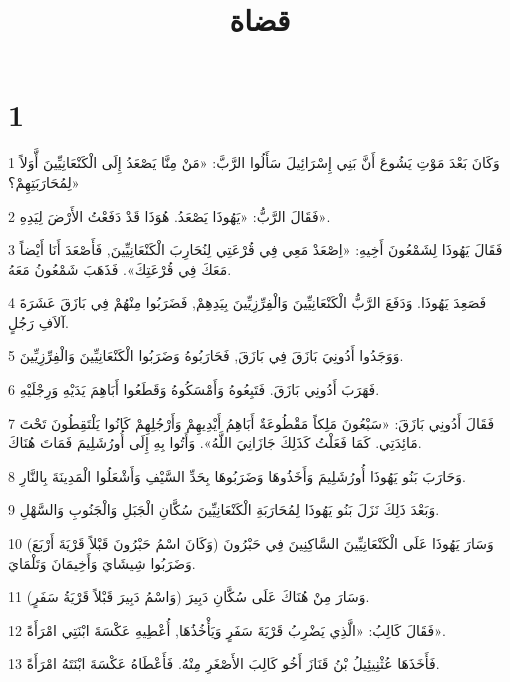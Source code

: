 

\title{قضاة }


\chapter{1}

\par 1 وَكَانَ بَعْدَ مَوْتِ يَشُوعَ أَنَّ بَنِي إِسْرَائِيلَ سَأَلُوا الرَّبَّ: «مَنْ مِنَّا يَصْعَدُ إِلَى الْكَنْعَانِيِّينَ أَّوَلاً لِمُحَارَبَتِهِمْ؟»
\par 2 فَقَالَ الرَّبُّ: «يَهُوذَا يَصْعَدُ. هُوَذَا قَدْ دَفَعْتُ الأَرْضَ لِيَدِهِ».
\par 3 فَقَالَ يَهُوذَا لِشَمْعُونَ أَخِيهِ: «اِصْعَدْ مَعِي فِي قُرْعَتِي لِنُحَارِبَ الْكَنْعَانِيِّينَ, فَأَصْعَدَ أَنَا أَيْضاً مَعَكَ فِي قُرْعَتِكَ». فَذَهَبَ شَمْعُونُ مَعَهُ.
\par 4 فَصَعِدَ يَهُوذَا. وَدَفَعَ الرَّبُّ الْكَنْعَانِيِّينَ وَالْفِرِّزِيِّينَ بِيَدِهِمْ, فَضَرَبُوا مِنْهُمْ فِي بَازَقَ عَشَرَةَ آلاَفِ رَجُلٍ.
\par 5 وَوَجَدُوا أَدُونِيَ بَازَقَ فِي بَازَقَ, فَحَارَبُوهُ وَضَرَبُوا الْكَنْعَانِيِّينَ وَالْفِرِّزِيِّينَ.
\par 6 فَهَرَبَ أَدُونِي بَازَقَ. فَتَبِعُوهُ وَأَمْسَكُوهُ وَقَطَعُوا أَبَاهِمَ يَدَيْهِ وَرِجْلَيْهِ.
\par 7 فَقَالَ أَدُونِي بَازَقَ: «سَبْعُونَ مَلِكاً مَقْطُوعَةٌ أَبَاهِمُ أَيْدِيهِمْ وَأَرْجُلِهِمْ كَانُوا يَلْتَقِطُونَ تَحْتَ مَائِدَتِي. كَمَا فَعَلْتُ كَذَلِكَ جَازَانِيَ اللَّهُ». وَأَتُوا بِهِ إِلَى أُورُشَلِيمَ فَمَاتَ هُنَاكَ.
\par 8 وَحَارَبَ بَنُو يَهُوذَا أُورُشَلِيمَ وَأَخَذُوهَا وَضَرَبُوهَا بِحَدِّ السَّيْفِ وَأَشْعَلُوا الْمَدِينَةَ بِالنَّارِ.
\par 9 وَبَعْدَ ذَلِكَ نَزَلَ بَنُو يَهُوذَا لِمُحَارَبَةِ الْكَنْعَانِيِّينَ سُكَّانِ الْجَبَلِ وَالْجَنُوبِ وَالسَّهْلِ.
\par 10 وَسَارَ يَهُوذَا عَلَى الْكَنْعَانِيِّينَ السَّاكِنِينَ فِي حَبْرُونَ (وَكَانَ اسْمُ حَبْرُونَ قَبْلاً قَرْيَةَ أَرْبَعَ) وَضَرَبُوا شِيشَايَ وَأَخِيمَانَ وَتَلْمَايَ.
\par 11 وَسَارَ مِنْ هُنَاكَ عَلَى سُكَّانِ دَبِيرَ (وَاسْمُ دَبِيرَ قَبْلاً قَرْيَةُ سَفَرٍ).
\par 12 فَقَالَ كَالِبُ: «الَّذِي يَضْرِبُ قَرْيَةَ سَفَرٍ وَيَأْخُذُهَا, أُعْطِيهِ عَكْسَةَ ابْنَتِي امْرَأَةً».
\par 13 فَأَخَذَهَا عُثْنِيئِيلُ بْنُ قَنَازَ أَخُو كَالِبَ الأَصْغَرِ مِنْهُ. فَأَعْطَاهُ عَكْسَةَ ابْنَتَهُ امْرَأَةً.
